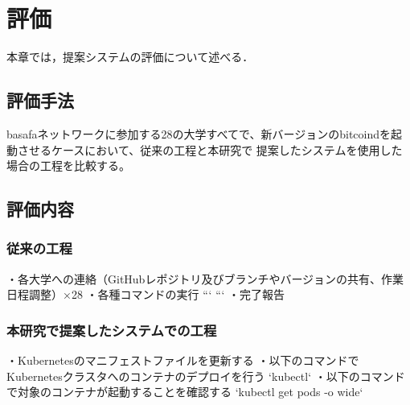 \chapter{評価}
\label{evaluation}
本章では，提案システムの評価について述べる．

\section{評価手法}
\label{evaluation:method}

basafaネットワークに参加する28の大学すべてで、新バージョンのbitcoindを起動させるケースにおいて、従来の工程と本研究で
提案したシステムを使用した場合の工程を比較する。

\section{評価内容}
\label{evaluation:content}

\subsection{従来の工程}

・各大学への連絡（GitHubレポジトリ及びブランチやバージョンの共有、作業日程調整）×28
・各種コマンドの実行
```
```
・完了報告

\subsection{本研究で提案したシステムでの工程}

・Kubernetesのマニフェストファイルを更新する
・以下のコマンドでKubernetesクラスタへのコンテナのデプロイを行う
`kubectl`
・以下のコマンドで対象のコンテナが起動することを確認する
`kubectl get pods -o wide`

